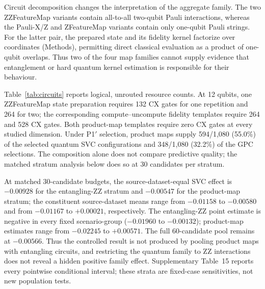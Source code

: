 \documentclass[referee,lineno,pdflatex,sn-vancouver-num]{sn-jnl}
\theoremstyle{thmstyleone}%
\theoremstyle{thmstyletwo}%
\theoremstyle{thmstylethree}%
\begin{document}
Circuit decomposition changes the interpretation of the aggregate family. The two ZZFeatureMap variants contain all-to-all two-qubit Pauli interactions, whereas the Pauli-X/Z and ZFeatureMap variants contain only one-qubit Pauli strings. For the latter pair, the prepared state and its fidelity kernel factorize over coordinates (Methods), permitting direct classical evaluation as a product of one-qubit overlaps. Thus two of the four map families cannot supply evidence that entanglement or hard quantum kernel estimation is responsible for their behaviour.

Table~\ref{tab:circuits} reports logical, unrouted resource counts. At 12 qubits, one ZZFeatureMap state preparation requires 132 CX gates for one repetition and 264 for two; the corresponding compute--uncompute fidelity templates require 264 and 528 CX gates. Both product-map templates require zero CX gates at every studied dimension. Under P1$'$ selection, product maps supply 594/1,080 (55.0\%) of the selected quantum SVC configurations and 348/1,080 (32.2\%) of the GPC selections. The composition alone does not compare predictive quality; the matched stratum analysis below does so at 30 candidates per stratum.

At matched 30-candidate budgets, the source-dataset-equal SVC effect is $-0.00928$ for the entangling-ZZ stratum and $-0.00547$ for the product-map stratum; the constituent source-dataset means range from $-0.01158$ to $-0.00580$ and from $-0.01167$ to $+0.00021$, respectively. The entangling-ZZ point estimate is negative in every fixed scenario-group ($-0.01960$ to $-0.00132$); product-map estimates range from $-0.02245$ to $+0.00571$. The full 60-candidate pool remains at $-0.00566$. Thus the controlled result is not produced by pooling product maps with entangling circuits, and restricting the quantum family to ZZ interactions does not reveal a hidden positive family effect. Supplementary Table~15 reports every pointwise conditional interval; these strata are fixed-case sensitivities, not new population tests.
\end{document}
